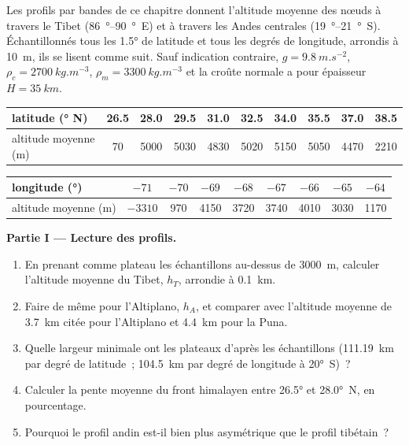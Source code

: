 \begin{problem}\label{pb:b2:himalaya-andes:1}
Les profils par bandes de ce chapitre donnent l'altitude moyenne des nœuds à travers le Tibet
(\qtyrange{86}{90}{\degree}~E) et à travers les Andes centrales (\qtyrange{19}{21}{\degree}~S). Échantillonnés
tous les \ang{1.5} de latitude et tous les degrés de longitude, arrondis à \qty{10}{m}, ils se
lisent comme suit. Sauf indication contraire, $g = \qty{9.8}{m.s^{-2}}$, $\rho_c = \qty{2700}{kg.m^{-3}}$,
$\rho_m = \qty{3300}{kg.m^{-3}}$ et la croûte normale a pour épaisseur $H = \qty{35}{km}$.

\smallskip
\begin{center}\small
\begin{tabular}{l|ccccccccc}
latitude (\unit{\degree} N) & 26.5 & 28.0 & 29.5 & 31.0 & 32.5 & 34.0 & 35.5 & 37.0 & 38.5 \\ \hline
altitude moyenne (\unit{m}) & 70 & 5000 & 5030 & 4830 & 5020 & 5150 & 5050 & 4470 & 2210
\end{tabular}

\smallskip
\begin{tabular}{l|cccccccc}
longitude (\unit{\degree}) & $-71$ & $-70$ & $-69$ & $-68$ & $-67$ & $-66$ & $-65$ & $-64$ \\ \hline
altitude moyenne (\unit{m}) & $-3310$ & 970 & 4150 & 3720 & 3740 & 4010 & 3030 & 1170
\end{tabular}
\end{center}
\smallskip

\noindent\textbf{Partie I --- Lecture des profils.}
\begin{enumerate}
\item En prenant comme plateau les échantillons au-dessus de \qty{3000}{m},
calculer l'altitude moyenne du Tibet, $h_T$, arrondie à \qty{0.1}{km}.
\item Faire de même pour l'Altiplano, $h_A$, et comparer avec l'altitude
moyenne de \qty{3.7}{km} citée pour l'Altiplano et \qty{4.4}{km} pour la Puna.
\item Quelle largeur minimale ont les plateaux d'après les échantillons (\qty{111.19}{km}
par degré de latitude~; \qty{104.5}{km} par degré de longitude à \ang{20}~S)~?
\item Calculer la pente moyenne du front himalayen
entre \ang{26.5} et \ang{28.0}~N, en pourcentage.
\item Pourquoi le profil andin est-il bien plus asymétrique que le profil tibétain~?
\end{enumerate}


\end{problem}
